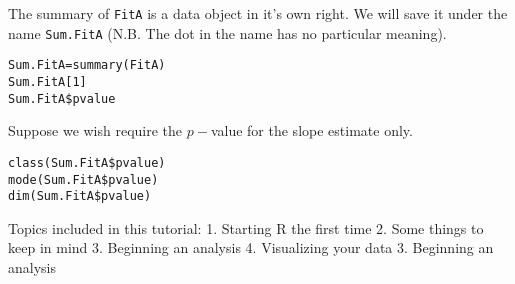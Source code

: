 \documentclass[a4paper,12pt]{article}
\begin{document}
The summary of \texttt{FitA} is a data object in it's own right. We will save it under the name \texttt{Sum.FitA} (N.B. The dot in the name has no particular meaning).
\begin{framed}
\begin{verbatim}
Sum.FitA=summary(FitA)
Sum.FitA[1]
Sum.FitA$pvalue
\end{verbatim}
\end{framed}
Suppose we wish require the $p-$value for the slope estimate only.
\begin{framed}
\begin{verbatim}
class(Sum.FitA$pvalue)
mode(Sum.FitA$pvalue)
dim(Sum.FitA$pvalue)
\end{verbatim}
\end{framed}





Topics included in this tutorial: 
1. Starting R the first time
2. Some things to keep in mind
3. Beginning an analysis
4. Visualizing your data
3. Beginning an analysis
\end{document}
